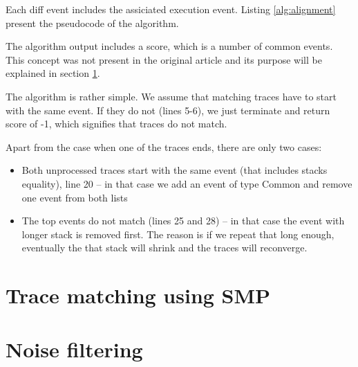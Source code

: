Each diff event includes the assiciated execution event.
Listing \ref{alg:alignment} present the pseudocode of the algorithm.


                       
The algorithm output includes a score, which is a number of common events.
This concept was not present in the original article and its purpose 
will be explained in section \ref{trace-matching}.

The algorithm is rather simple. We assume that matching traces have to start with the same
event. If they do not (lines 5-6), we just terminate and return score of -1, 
which signifies that traces do not match.

Apart from the case when one of the traces ends, there are only two cases:
\begin{itemize}
  \item Both unprocessed traces start with the same event (that includes stacks equality), line 20 -- in that case
  			we add an event of type Common and remove one event from both lists
  \item The top events do not match (lines 25 and 28) -- in that case the event with longer stack is removed first.
           The reason is if we repeat that long enough, eventually the that stack will shrink and the traces will reconverge.
           
\end{itemize}

\section{Trace matching using SMP}
\label{trace-matching}

\section{Noise filtering}


